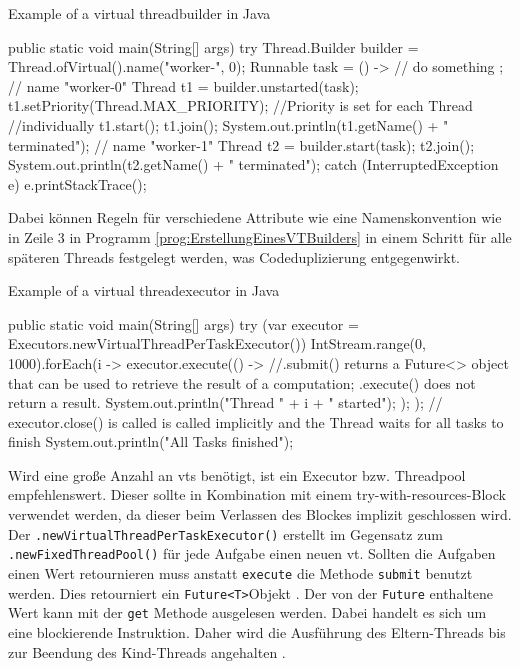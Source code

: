     \begin{program} [H]
        \caption{Example of a virtual threadbuilder in Java}
        \label{prog:ErstellungEinesVTBuilders}
    \begin{JavaCode}[language=Java, numbers=left]
public static void main(String[] args) {
    try {
        Thread.Builder builder = Thread.ofVirtual().name("worker-", 0);
        Runnable task = () -> {
            // do something
        };
        // name "worker-0"
        Thread t1 = builder.unstarted(task);
        t1.setPriority(Thread.MAX_PRIORITY);    //Priority is set for each Thread 
                                                //individually   
        t1.start(); t1.join();
        System.out.println(t1.getName() + " terminated");
        // name "worker-1"
        Thread t2 = builder.start(task);   
        t2.join();  
        System.out.println(t2.getName() + " terminated");
    } catch (InterruptedException e) {
        e.printStackTrace();
    }
}\end{JavaCode}
    \end{program}

    Dabei können Regeln für verschiedene Attribute wie eine Namenskonvention wie in Zeile 3 in Programm \ref{prog:ErstellungEinesVTBuilders}
    in einem Schritt für alle späteren Threads festgelegt werden, was Codeduplizierung entgegenwirkt.

    \begin{program} [H]
        \caption{Example of a virtual threadexecutor in Java}
        \label{prog:ErstellungEinesExecutors}
    \begin{JavaCode}[language=Java, numbers=left]
public static void main(String[] args) {
    try (var executor = Executors.newVirtualThreadPerTaskExecutor()){
        IntStream.range(0, 1000).forEach(i -> {
            executor.execute(() -> {     //.submit() returns a Future<> object that can be used to retrieve the result of a computation; .execute() does not return a result.
                System.out.println("Thread " + i + " started");
            });
        });
    }       // executor.close() is called is called implicitly and the Thread waits for all tasks to finish
    System.out.println("All Tasks finished"); 
}\end{JavaCode}
    \end{program}

    Wird eine große Anzahl an \Glspl{vt} benötigt,  ist ein Executor bzw. Threadpool empfehlenswert. Dieser sollte in Kombination mit einem
    try-with-resources-Block verwendet werden, da dieser beim Verlassen des Blockes implizit geschlossen wird. Der \texttt{.newVirtualThreadPerTaskExecutor()}
    erstellt im Gegensatz zum \texttt{.newFixedThreadPool()} für jede Aufgabe einen neuen \gls{vt}.
    Sollten die Aufgaben einen Wert retournieren muss anstatt \texttt{execute} die Methode \texttt{submit} benutzt werden. Dies retourniert ein \texttt{Future<T>}Objekt 
    \cite{oracle21VritualThreads}.
    Der von der \texttt{Future} enthaltene Wert kann mit der
    \texttt{get}  Methode ausgelesen werden. Dabei handelt es sich um eine blockierende Instruktion. Daher wird die Ausführung des Eltern-Threads bis zur
    Beendung des Kind-Threads angehalten \cite{oracle21Future}.
    


